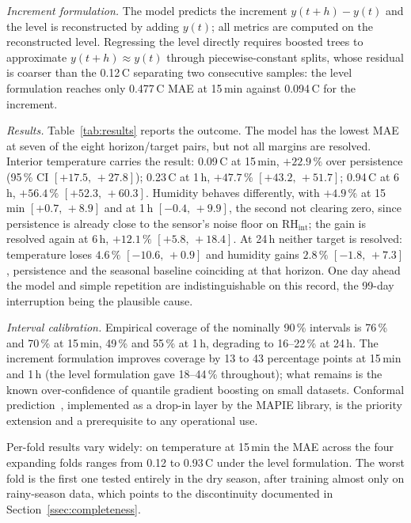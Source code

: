\documentclass[conference]{IEEEtran}
\begin{document}
\textit{Increment formulation.} The model predicts the increment
$y(t{+}h) - y(t)$ and the level is reconstructed by adding $y(t)$; all
metrics are computed on the reconstructed level. Regressing the level
directly requires boosted trees to approximate $y(t{+}h) \approx y(t)$
through piecewise-constant splits, whose residual is coarser than the
0.12\,\textdegree{}C separating two consecutive samples: the level
formulation reaches only 0.477\,\textdegree{}C MAE at 15\,min against
0.094\,\textdegree{}C for the increment.

\textit{Results.} Table~\ref{tab:results} reports the outcome. The
model has the lowest MAE at seven of the eight horizon/target pairs,
but not all margins are resolved. Interior temperature carries the
result: 0.09\,\textdegree{}C at 15\,min, $+22.9\,\%$ over persistence
(95\,\% CI $[+17.5,\,+27.8]$); 0.23\,\textdegree{}C at 1\,h,
$+47.7\,\%$ $[+43.2,\,+51.7]$; 0.94\,\textdegree{}C at 6\,h,
$+56.4\,\%$ $[+52.3,\,+60.3]$. Humidity behaves differently, with
$+4.9\,\%$ at 15\,min $[+0.7,\,+8.9]$ and at 1\,h $[-0.4,\,+9.9]$, the
second not clearing zero, since persistence is already close to the
sensor's noise floor on $\text{RH}_\text{int}$; the gain is resolved
again at 6\,h, $+12.1\,\%$ $[+5.8,\,+18.4]$. At 24\,h neither target is
resolved: temperature loses $4.6\,\%$ $[-10.6,\,+0.9]$ and humidity
gains $2.8\,\%$ $[-1.8,\,+7.3]$, persistence and the seasonal baseline
coinciding at that horizon. One day ahead the model and simple
repetition are indistinguishable on this record, the 99-day
interruption being the plausible cause.

\textit{Interval calibration.} Empirical coverage of the nominally
90\,\% intervals is 76\,\% and 70\,\% at 15\,min, 49\,\% and 55\,\% at
1\,h, degrading to 16--22\,\% at 24\,h. The increment formulation
improves coverage by 13 to 43 percentage points at 15\,min and 1\,h (the
level formulation gave 18--44\,\% throughout); what remains is the
known over-confidence of quantile gradient boosting on small datasets.
Conformal prediction~\cite{angelopoulos2021}, implemented as a drop-in
layer by the MAPIE library, is the priority extension and a
prerequisite to any operational use.

Per-fold results vary widely: on temperature at 15\,min the MAE
across the four expanding folds ranges from 0.12 to 0.93\,\textdegree{}C
under the level formulation. The worst fold is the first one tested
entirely in the dry season, after training almost only on rainy-season
data, which points to the discontinuity documented in
Section~\ref{ssec:completeness}.
\end{document}
